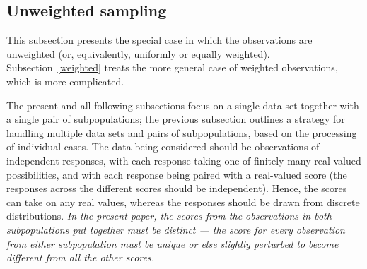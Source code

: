 \documentclass{article}
\begin{document}
\subsection{Unweighted sampling}
\label{unweighted}

This subsection presents the special case in which the observations
are unweighted (or, equivalently, uniformly or equally weighted).
Subsection~\ref{weighted} treats the more general case
of weighted observations, which is more complicated.

The present and all following subsections focus on a single data set
together with a single pair of subpopulations;
the previous subsection outlines a strategy for handling multiple data sets
and pairs of subpopulations, based on the processing of individual cases.
The data being considered should be observations of independent responses,
with each response taking one of finitely many real-valued possibilities,
and with each response being paired with a real-valued score
(the responses across the different scores should be independent).
Hence, the scores can take on any real values,
whereas the responses should be drawn from discrete distributions.
{\it In the present paper, the scores from the observations
in both subpopulations put together must be distinct
--- the score for every observation from either subpopulation must be unique
or else slightly perturbed to become different from all the other scores.}
\end{document}
